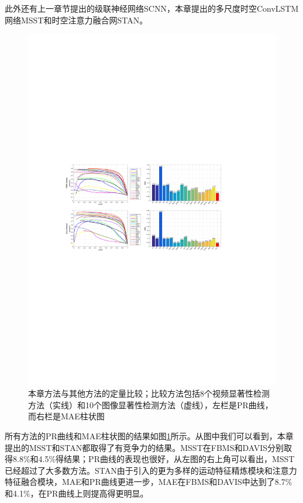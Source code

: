 此外还有上一章节提出的级联神经网络SCNN，本章提出的多尺度时空ConvLSTM网络MSST和时空注意力融合网STAN。

\begin{figure}
\centering
\includegraphics[width=1\textwidth]{figures/methos_compare_new3}
\caption{本章方法与其他方法的定量比较；比较方法包括8个视频显著性检测方法（实线）和10个图像显著性检测方法（虚线），左栏是PR曲线，而右栏是MAE柱状图}
\label{figure4}
\end{figure}

所有方法的PR曲线和MAE柱状图的结果如图\ref{figure4}所示。从图中我们可以看到，本章提出的MSST和STAN都取得了有竞争力的结果。MSST在FBMS和DAVIS分别取得8.8\%和4.5\%得结果；PR曲线的表现也很好，从左图的右上角可以看出，MSST已经超过了大多数方法。STAN由于引入的更为多样的运动特征精炼模块和注意力特征融合模块，MAE和PR曲线更进一步，MAE在FBMS和DAVIS中达到了8.7\%和4.1\%，在PR曲线上则提高得更明显。

